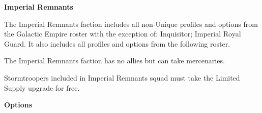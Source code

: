 \documentclass{article}
\begin{document}
\newpage

{\Huge \textbf{Imperial Remnants}}
\vspace{0.6cm}

\begin{minipage}{19cm}
    The Imperial Remnants faction includes all non-Unique profiles and options
    from the Galactic Empire roster with the exception of: Inquisitor; Imperial Royal Guard.
    It also includes all profiles and options from the following roster.
    \vspace{0.3cm}

    The Imperial Remnants faction has no allies but can take mercenaries.
    \vspace{0.3cm}

    Stormtroopers included in Imperial Remnants squad must take the Limited Supply upgrade for free.
\end{minipage}

\vspace{0.3cm}
{\scriptsize
\setlength\extrarowheight{1.5pt}

}
\vspace{0.6cm}

{\large \textbf{Options}}
\vspace{0.3cm}
\begin{multicols}{2}
    {\scriptsize

    \setlength\extrarowheight{1.5pt}
    

    \vspace{0.6cm}

    \setlength\extrarowheight{1.5pt}
    

    \vspace{0.6cm}

    \setlength\extrarowheight{1.5pt}
    

    \vspace{0.6cm}

    \setlength\extrarowheight{1.5pt}
    

    \vspace{0.6cm}

    \setlength\extrarowheight{1.5pt}
    

    \vspace{0.6cm}

    \setlength\extrarowheight{1.5pt}
    

    \vspace{0.6cm}

    \setlength\extrarowheight{1.5pt}
    
    }
\end{multicols}
\end{document}
